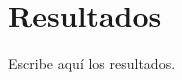\documentclass[../main.tex]{subfiles}
\begin{document}
\chapter{Resultados}

Escribe aquí los resultados.
\end{document}
